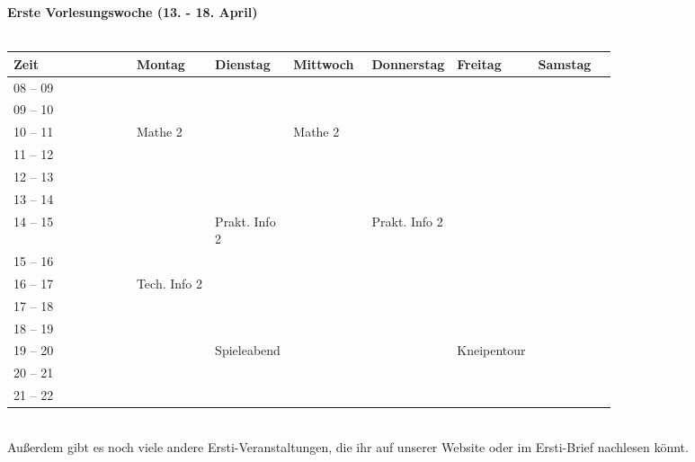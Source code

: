 
 \textbf{Erste Vorlesungswoche (13. - 18. April)}\\
 \\
 \begin{tabular}{|l|p{0.13\linewidth}|p{0.13\linewidth}|p{0.13\linewidth}|p{0.13\linewidth}|p{0.13\linewidth}|p{0.13\linewidth}|} \hline
  Zeit & Montag & Dienstag & Mittwoch & Donnerstag & Freitag & Samstag \\ 
  \hline \hline 
  08 -- 09 & & & & & &\\ \cline{1-1}
  09 -- 10 &  & & & & &  \\ \cline{1-2} \cline{4-4} 
  10 -- 11 & \footnotesize{Mathe 2} & &  \footnotesize{Mathe 2} & & & \\ \cline{1-1}
  11 -- 12 & & & & & & \\ \cline{1-1} \cline{2-2} \cline{4-4}
  12 -- 13 & & & & & & \\ \cline{1-1} 
  13 -- 14 & & & & & & \\ \cline{1-1} \cline{3-3} \cline{5-5}
  14 -- 15 & &\footnotesize{Prakt. Info 2} & &\footnotesize{Prakt. Info 2} & & \\ \cline{1-1}
  15 -- 16 & & & & & & \\ \cline {1-3} \cline{5-5}
  16 -- 17 & \footnotesize{Tech. Info 2} & & & & & \\ \cline{1-1}
  17 -- 18 & & & & & & \\ \cline{1-1}
  18 -- 19 & & & & & &  \\ \cline{1-3} \cline{6-6}
  19 -- 20 & & \cellcolor{lightlightgray} \footnotesize{Spieleabend} & & & \cellcolor{lightlightgray} \footnotesize{Kneipentour} & \\ \cline{1-1}
  20 -- 21 & & \cellcolor{lightlightgray} & & & \cellcolor{lightlightgray} & \\ \cline{1-1}
  21 -- 22 & & \cellcolor{lightlightgray} & & & \cellcolor{lightlightgray} & \\ \hline
 \end{tabular}
 \\

\normalsize
Außerdem gibt es noch viele andere Ersti-Veranstaltungen, die ihr auf unserer Website oder im Ersti-Brief nachlesen könnt. 

